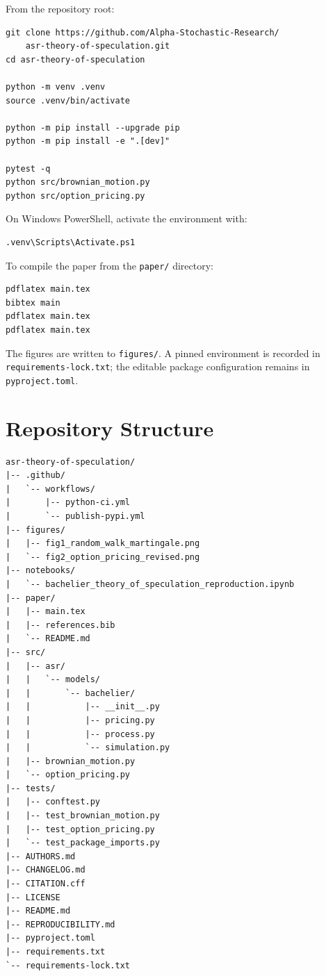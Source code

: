 \documentclass[11pt,a4paper]{article}
\begin{document}
From the repository root:

\begin{verbatim}
git clone https://github.com/Alpha-Stochastic-Research/
    asr-theory-of-speculation.git
cd asr-theory-of-speculation

python -m venv .venv
source .venv/bin/activate

python -m pip install --upgrade pip
python -m pip install -e ".[dev]"

pytest -q
python src/brownian_motion.py
python src/option_pricing.py
\end{verbatim}

On Windows PowerShell, activate the environment with:

\begin{verbatim}
.venv\Scripts\Activate.ps1
\end{verbatim}

To compile the paper from the \texttt{paper/} directory:

\begin{verbatim}
pdflatex main.tex
bibtex main
pdflatex main.tex
pdflatex main.tex
\end{verbatim}

The figures are written to \texttt{figures/}. A pinned environment is recorded in \texttt{requirements-lock.txt}; the editable package configuration remains in \texttt{pyproject.toml}.

\section{Repository Structure}

\begin{verbatim}
asr-theory-of-speculation/
|-- .github/
|   `-- workflows/
|       |-- python-ci.yml
|       `-- publish-pypi.yml
|-- figures/
|   |-- fig1_random_walk_martingale.png
|   `-- fig2_option_pricing_revised.png
|-- notebooks/
|   `-- bachelier_theory_of_speculation_reproduction.ipynb
|-- paper/
|   |-- main.tex
|   |-- references.bib
|   `-- README.md
|-- src/
|   |-- asr/
|   |   `-- models/
|   |       `-- bachelier/
|   |           |-- __init__.py
|   |           |-- pricing.py
|   |           |-- process.py
|   |           `-- simulation.py
|   |-- brownian_motion.py
|   `-- option_pricing.py
|-- tests/
|   |-- conftest.py
|   |-- test_brownian_motion.py
|   |-- test_option_pricing.py
|   `-- test_package_imports.py
|-- AUTHORS.md
|-- CHANGELOG.md
|-- CITATION.cff
|-- LICENSE
|-- README.md
|-- REPRODUCIBILITY.md
|-- pyproject.toml
|-- requirements.txt
`-- requirements-lock.txt
\end{verbatim}



\end{document}
